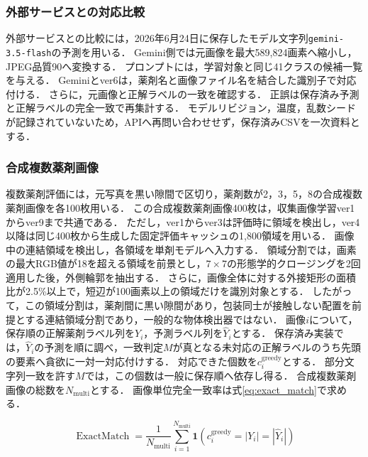 \documentclass[uplatex,dvipdfmx]{jsarticle}
\begin{document}
\subsubsection{外部サービスとの対応比較}

外部サービスとの比較には，2026年6月24日に保存したモデル文字列\texttt{gemini-3.5-flash}の予測を用いる\cite{google_gemini35flash}．
Gemini側では元画像を最大589,824画素へ縮小し，JPEG品質90へ変換する．
プロンプトには，学習対象と同じ41クラスの候補一覧を与える．
Geminiとver6は，薬剤名と画像ファイル名を結合した識別子で対応付ける．
さらに，元画像と正解ラベルの一致を確認する．
正誤は保存済み予測と正解ラベルの完全一致で再集計する．
モデルリビジョン，温度，乱数シードが記録されていないため，APIへ再問い合わせせず，保存済みCSVを一次資料とする．

\subsubsection{合成複数薬剤画像}\label{sec:multi_eval}

複数薬剤評価には，元写真を黒い隙間で区切り，薬剤数が2，3，5，8の合成複数薬剤画像を各100枚用いる．
この合成複数薬剤画像400枚は，収集画像学習ver1からver9まで共通である．
ただし，ver1からver3は評価時に領域を検出し，ver4以降は同じ400枚から生成した固定評価キャッシュの1,800領域を用いる．
画像中の連結領域を検出し，各領域を単剤モデルへ入力する．
領域分割では，画素の最大RGB値が18を超える領域を前景とし，$7\times7$の形態学的クロージングを2回適用した後，外側輪郭を抽出する．
さらに，画像全体に対する外接矩形の面積比が2.5\%以上で，短辺が100画素以上の領域だけを識別対象とする．
したがって，この領域分割は，薬剤間に黒い隙間があり，包装同士が接触しない配置を前提とする連結領域分割であり，一般的な物体検出器ではない．
画像$i$について，保存順の正解薬剤ラベル列を$Y_i$，予測ラベル列を$\hat{Y}_i$とする．
保存済み実装では，$\hat{Y}_i$の予測を順に調べ，一致判定$M$が真となる未対応の正解ラベルのうち先頭の要素へ貪欲に一対一対応付けする．
対応できた個数を$c_i^{\mathrm{greedy}}$とする．
部分文字列一致を許す$M$では，この個数は一般に保存順へ依存し得る．
合成複数薬剤画像の総数を$N_{\mathrm{multi}}$とする．
画像単位完全一致率は式\eqref{eq:exact_match}で求める．

\begin{equation}
  \operatorname{ExactMatch}
  =
  \frac{1}{N_{\mathrm{multi}}}
  \sum_{i=1}^{N_{\mathrm{multi}}}
  \mathbf{1}\!\left(c_i^{\mathrm{greedy}}=|Y_i|=|\hat{Y}_i|\right)
  \label{eq:exact_match}
\end{equation}
\end{document}
